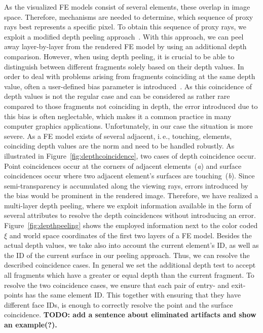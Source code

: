 \documentclass[review,journal]{vgtc}         %
\begin{document}
As the visualized FE models consist of several elements, these overlap in image space. Therefore, mechanisms are needed to determine, which sequence of proxy rays best represents a specific pixel. To obtain this sequence of proxy rays, we exploit a modified depth peeling approach~\cite{mammen89DepthPeeling}. With this approach, we can peel away layer-by-layer from the rendered FE model by using an additional depth comparison. However, when using depth peeling, it is crucial to be able to distinguish between different fragments solely based on their depth values. In order to deal with problems arising from fragments coinciding at the same depth value, often a user-defined bias parameter is introduced~\cite{Everitt01interactiveorder-independent}. As this coincidence of depth values is not the regular case and can be considered as rather rare compared to those fragments not coinciding in depth, the error introduced due to this bias is often neglectable, which makes it a common practice in many computer graphics applications. Unfortunately, in our case the situation is more severe. As a FE model exists of several adjacent, i.\,e., touching, elements, coinciding depth values are the norm and need to be handled robustly. As illustrated in Figure~\ref{fig:depthcoincidence}, two cases of depth coincidence occur. Point coincidences occur at the corners of adjacent elements~({\it a}) and surface coincidences occur where two adjacent element's surfaces are touching~({\it b}). Since semi-transparency is accumulated along the viewing rays, errors introduced by the bias would be prominent in the rendered image. Therefore, we have realized a multi-layer depth peeling, where we exploit information available in the form of several attributes to resolve the depth coincidences without introducing an error. Figure~\ref{fig:depthpeeling} shows the employed information next to the color coded $\xi$ and world space coordinates of the first two layers of a FE model. Besides the actual depth values, we take also into account the current element's ID, as well as the ID of the current surface in our peeling approach. Thus, we can resolve the described coincidence cases. In general we set the additional depth test to accept all fragments which have a greater or equal depth than the current fragment. To resolve the two coincidence cases, we ensure that each pair of entry- and exit-points has the same element ID. This together with ensuring that they have different face IDs, is enough to correctly resolve the point and the surface coincidence. \textbf{TODO: add a sentence about eliminated artifacts and show an example(?).}
\end{document}
